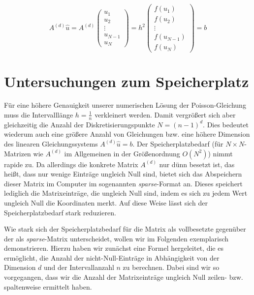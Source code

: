 \documentclass{scrartcl}
\begin{document}
\[A^{(d)}\hat{u}=
A^{(d)}
\begin{pmatrix}
  u_1\\
  u_2\\
  \vdots\\
  u_{N-1}\\
  u_N
\end{pmatrix}
=
h^2
\begin{pmatrix}
  f(u_1)\\
  f(u_2)\\
  \vdots\\
  f(u_{N-1})\\
  f(u_N)
\end{pmatrix}
= b
\]

\pagebreak
\section{Untersuchungen zum Speicherplatz}
Für eine höhere Genauigkeit unserer numerischen Lösung der Poisson-Gleichung muss die Intervalllänge $h=\frac{1}{n}$ verkleinert werden.
Damit vergrößert sich aber gleichzeitig die Anzahl der Diskretisierungspunkte $N=(n-1)^d$.
Dies bedeutet wiederum auch eine größere Anzahl von Gleichungen bzw. eine höhere Dimension des linearen Gleichungssystems $A^{(d)}\hat{u}=b$.
Der Speicherplatzbedarf (für $N\times N$-Matrizen wie $A^{(d)}$ im Allgemeinen in der Größenordnung $O(N^2)$) nimmt rapide zu.
Da allerdings die konkrete Matrix $A^{(d)}$ nur dünn besetzt ist, das heißt, dass nur wenige Einträge ungleich Null sind, bietet sich das Abspeichern dieser Matrix im Computer im sogenannten \textit{sparse}-Format an.
Dieses speichert lediglich die Matrixeinträge, die ungleich Null sind, indem es sich zu jedem Wert ungleich Null die Koordinaten merkt.
Auf diese Weise lässt sich der Speicherplatzbedarf stark reduzieren.\cite{rabus2019}

Wie stark sich der Speicherplatzbedarf für die Matrix als vollbesetzte gegenüber der als \textit{sparse}-Matrix unterscheidet, wollen wir im Folgenden exemplarisch demonstrieren.
Hierzu haben wir zunächst eine Formel hergeleitet, die es ermöglicht, die Anzahl der nicht-Null-Einträge in Abhängigkeit von der Dimension $d$ und der Intervallanzahl $n$ zu berechnen. Dabei sind wir so vorgegangen, dass wir die Anzahl der Matrixeinträge ungleich Null zeilen- bzw. spaltenweise ermittelt haben.
\end{document}
